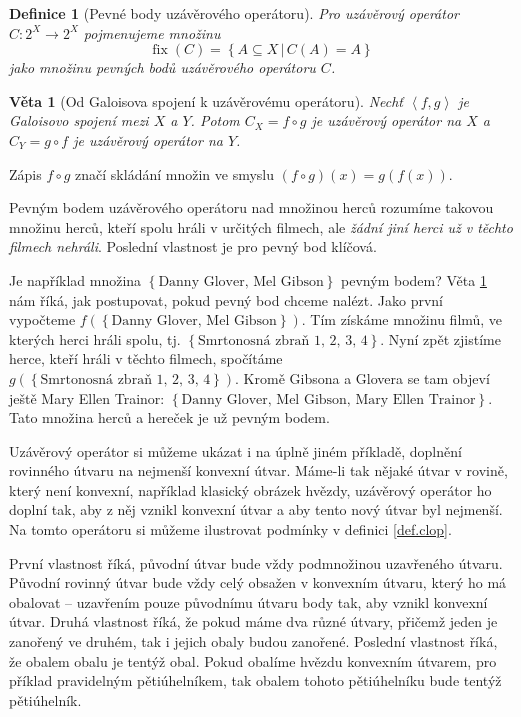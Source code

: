 \documentclass[12pt]{article}
\newcommand{\sep}{\,|\,}
\newcommand{\adds}[1]{\left\{#1\right\}}
\newcommand{\addsp}[1]{\left<#1\right>}
\newcommand{\strong}[1]{{\em #1}}
\DeclareMathOperator{\fix}{fix}
\newtheorem{mydef}{Definice}
\newtheorem{theorem}{Věta}
\begin{document}
\begin{mydef}[Pevné body uzávěrového operátoru]
Pro uzávěrový operátor $C: 2^X\rightarrow2^X$ pojmenujeme množinu
$$
\fix(C)=\adds{A\subseteq X\sep C(A)=A}
$$
jako množinu pevných bodů uzávěrového operátoru $C$.
\end{mydef}

\begin{theorem}[Od Galoisova spojení k uzávěrovému operátoru]\label{th.galcl}
Nechť $\addsp{f,g}$ je Galoisovo spojení mezi $X$ a $Y$. Potom $C_X=f\circ g$ je uzávěrový operátor na $X$ a $C_Y=g\circ f$ je uzávěrový operátor na $Y$.
\end{theorem}

Zápis $f \circ g$ značí skládání množin ve smyslu $(f \circ g)(x) = g(f(x))$.

Pevným bodem uzávěrového operátoru nad množinou herců rozumíme takovou množinu herců, kteří spolu hráli v určitých filmech, ale \strong{žádní jiní herci už v těchto filmech nehráli}. Poslední vlastnost je pro pevný bod klíčová. 

Je například množina $\adds{\mbox{Danny Glover, Mel Gibson}}$ pevným bodem? Věta \ref{th.galcl} nám říká, jak postupovat, pokud pevný bod chceme nalézt. Jako první vypočteme $f(\adds{\mbox{Danny Glover, Mel Gibson}})$. Tím získáme množinu filmů, ve kterých herci hráli spolu, tj. $\adds{\mbox{Smrtonosná zbraň 1, 2, 3, 4}}$. Nyní zpět zjistíme herce, kteří hráli v těchto filmech, spočítáme $g(\adds{\mbox{Smrtonosná zbraň 1, 2, 3, 4}})$. Kromě Gibsona a Glovera se tam objeví ještě Mary Ellen Trainor: $\adds{\mbox{Danny Glover, Mel Gibson, Mary Ellen Trainor}}$. Tato množina herců a hereček je už pevným bodem. 

Uzávěrový operátor si můžeme ukázat i na úplně jiném příkladě, doplnění rovinného útvaru na nejmenší konvexní útvar. Máme-li tak nějaké útvar v rovině, který není konvexní, například klasický obrázek hvězdy, uzávěrový operátor ho doplní tak, aby z něj vznikl konvexní útvar a aby tento nový útvar byl nejmenší. Na tomto operátoru si můžeme ilustrovat podmínky v definici \ref{def.clop}.

První vlastnost říká, původní útvar bude vždy podmnožinou uzavřeného útvaru. Původní rovinný útvar bude vždy celý obsažen v konvexním útvaru, který ho má obalovat -- uzavřením pouze  původnímu útvaru body tak, aby vznikl konvexní útvar. Druhá vlastnost říká, že pokud máme dva různé útvary, přičemž jeden je zanořený ve druhém, tak i jejich obaly budou zanořené. Poslední vlastnost říká, že obalem obalu je tentýž obal. Pokud obalíme hvězdu konvexním útvarem, pro příklad pravidelným pětiúhelníkem, tak obalem tohoto pětiúhelníku bude tentýž pětiúhelník.
\end{document}
